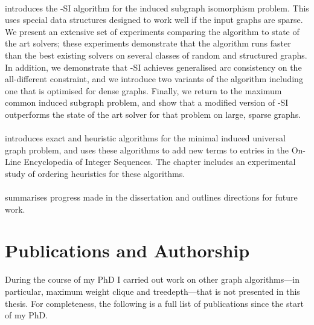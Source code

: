 \paragraph*{} \hspace{-.8em} introduces the \McSplit-SI algorithm for the
induced subgraph isomorphism problem.  This uses
special data structures designed to work well if the input graphs are sparse.
We present an extensive set of experiments comparing the algorithm to state of
the art solvers; these experiments demonstrate that the algorithm runs faster than the
best existing solvers on several classes of random and structured
graphs.
In addition, we demonstrate that \McSplit-SI achieves generalised arc consistency
on the all-different constraint, and we introduce two variants of the algorithm
including one that is optimised for dense graphs.
Finally, we return to the maximum common induced subgraph problem, and show that
a modified version of \McSplit-SI outperforms the state of the art solver for that
problem on large, sparse graphs.

\paragraph*{} \hspace{-.8em} introduces exact and heuristic
algorithms for the minimal induced universal graph problem, and uses these
algorithms to add new terms to entries in
the On-Line Encyclopedia of Integer Sequences.  The chapter includes
an experimental study of ordering heuristics for these algorithms.

\paragraph*{} \hspace{-.8em} summarises progress made in the dissertation
and outlines directions for future work.

\section{Publications and Authorship}

During the course of my PhD I carried out work on other graph algorithms---in particular,
maximum weight clique and treedepth---that is not presented in this thesis.
For completeness, the following is a full list of publications
since the start of my PhD.

